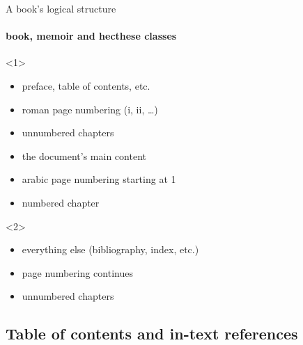 \begin{frame}[fragile]{A book's logical structure}
	\framesubtitle{book, memoir and hecthese classes}

\begin{onlyenv}<1>
\begin{codesource}
	\frontmatter
\end{codesource}	
	\begin{itemize}
		\item preface, table of contents, etc.
		\item roman page numbering (i, ii, \ldots)
		\item unnumbered chapters
	\end{itemize}
\begin{codesource}
	\mainmatter
\end{codesource}	
	\begin{itemize}
		\item the document's main content
		\item arabic page numbering starting at 1
		\item numbered chapter
	\end{itemize}
\end{onlyenv}

\begin{onlyenv}<2>
\begin{codesource}
	\backmatter
\end{codesource}
	\begin{itemize}
		\item everything else (bibliography, index, etc.)
		\item page numbering continues 
		\item unnumbered chapters
	\end{itemize}
\end{onlyenv}
\end{frame}

\subsection{Table of contents and in-text references}

